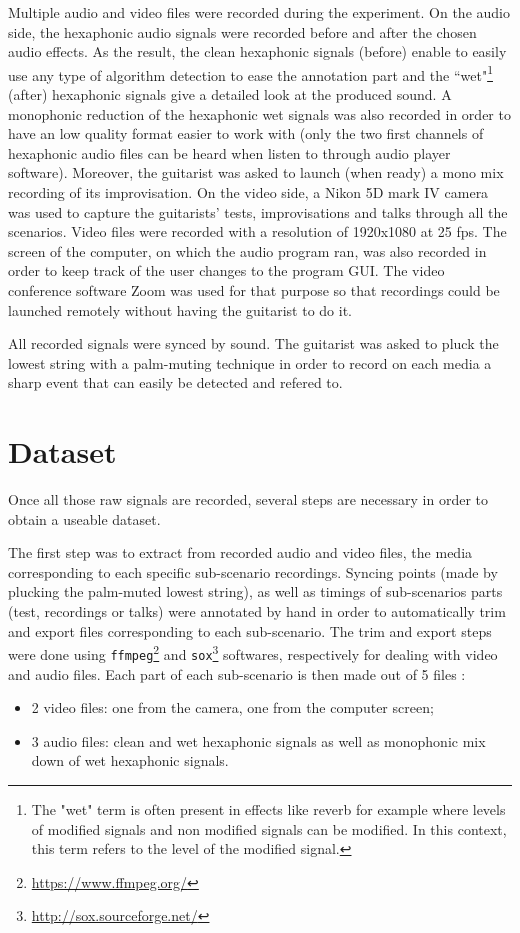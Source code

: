\documentclass{article}
\begin{document}
Multiple audio and video files were recorded during the experiment. 
On the audio side, the hexaphonic audio signals were recorded before and after the chosen audio effects. As the result, the clean hexaphonic signals (before) enable to easily use any type of algorithm detection to ease the annotation part and the ``wet"\footnote{The "wet" term is often present in effects like reverb for example where levels of modified signals and non modified signals can be modified. In this context, this term refers to the level of the modified signal.} (after) hexaphonic signals give a detailed look at the produced sound. A monophonic reduction of the hexaphonic wet signals was also recorded in order to have an low quality format easier to work with (only the two first channels of hexaphonic audio files can be heard when listen to through audio player software).
Moreover, the guitarist was asked to launch (when ready) a mono mix recording of its improvisation. On the video side, a Nikon 5D mark IV camera was used to capture the guitarists' tests, improvisations and talks through all the scenarios. Video files were recorded with a resolution of 1920x1080 at 25 fps. The screen of the computer, on which the audio program ran, was also recorded in order to keep track of the user changes to the program GUI. The video conference software Zoom was used for that purpose so that recordings could be launched remotely without having the guitarist to do it.

All recorded signals were synced by sound. The guitarist was asked to pluck the lowest string with a palm-muting technique in order to record on each media a sharp event that can easily be detected and refered to.

\section{Dataset}\label{sec:dataset}
Once all those raw signals are recorded, several steps are necessary in order to obtain a useable dataset. 

The first step was to extract from recorded audio and video files, the media corresponding to each specific sub-scenario recordings. Syncing points (made by plucking the palm-muted lowest string), as well as timings of sub-scenarios parts (test, recordings or talks) were annotated by hand in order to automatically trim and export files corresponding to each sub-scenario. The trim and export steps were done using \texttt{ffmpeg}\footnote{\url{https://www.ffmpeg.org/}} and \texttt{sox}\footnote{\url{http://sox.sourceforge.net/}} softwares, respectively for dealing with video and audio files. Each part of each sub-scenario is then made out of 5 files : 
\begin{itemize}
\item 2 video files: one from the camera, one from the computer screen;
\item 3 audio files: clean and wet hexaphonic signals as well as monophonic mix down of wet hexaphonic signals.
\end{itemize}  
\end{document}
